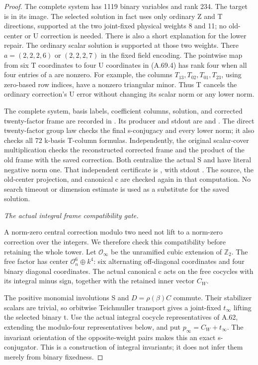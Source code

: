 \begin{proof}
The complete system has 1119 binary variables and rank 234.
The target is in its image. The selected solution in fact uses
only ordinary Z and T directions, supported at the two joint-fixed
physical weights 8 and 11; no old-center or U correction is needed.
There is also a short explanation for the lower repair. The
ordinary scalar solution is supported at those two weights. There
\(a=(2,2,2,6)\) or \((2,2,2,7)\) in the fixed field encoding.
The pointwise map from six T coordinates to four U coordinates
in (A.69.4) has rank four when all four entries of a are nonzero.
For example, the columns \(T_{13},T_{02},T_{01},T_{23}\),
using zero-based row indices, have a nonzero triangular minor.
Thus T cancels the ordinary correction's U error without changing
its scalar norm or any lower norm.

The complete system, basis labels, coefficient columns, solution,
and corrected twenty-factor frame are recorded in
.
Its producer and stdout are
 and
.
The direct twenty-factor group law checks the final s-conjugacy
and every lower norm; it also checks all 72 k-basis T-column
formulas. Independently, the original scalar-cover multiplication
checks the reconstructed corrected frame and the product of the
old frame with the saved correction. Both centralize the actual S
and have literal negative norm one. That independent certificate
is , with
stdout .
The source, the old-center projection, and canonical c are checked
again in that computation. No search timeout or dimension estimate
is used as a substitute for the saved solution.

\emph{The actual integral frame compatibility gate.}\par
A norm-zero central correction modulo two need not lift to a
norm-zero correction over the integers. We therefore check this
compatibility before retaining the whole tower. Let
\(\mathcal O_\infty\) be the unramified cubic extension of
\(\mathbb Z_2\). The free factor has center
\(\mathcal O_n^6\oplus k^4\): six alternating off-diagonal
coordinates and four binary diagonal coordinates. The actual
canonical c acts on the free cocycles with its integral minus
sign, together with the retained inner vector \(C_W\).

The positive monomial involutions S and
\(D=\rho(\beta)C\) commute. Their stabilizer scalars are
trivial, so orbitwise Teichmuller transport gives a joint-fixed
\(t_\infty\) lifting the selected binary t. Use the actual
integral cocycle representatives of A.62, extending the modulo-four
representatives below, and put \(p_\infty=C_W+t_\infty\).
The invariant orientation of the opposite-weight pairs makes
this an exact s-conjugator. This is a construction of integral
invariants; it does not infer them merely from binary fixedness.


\end{proof}
